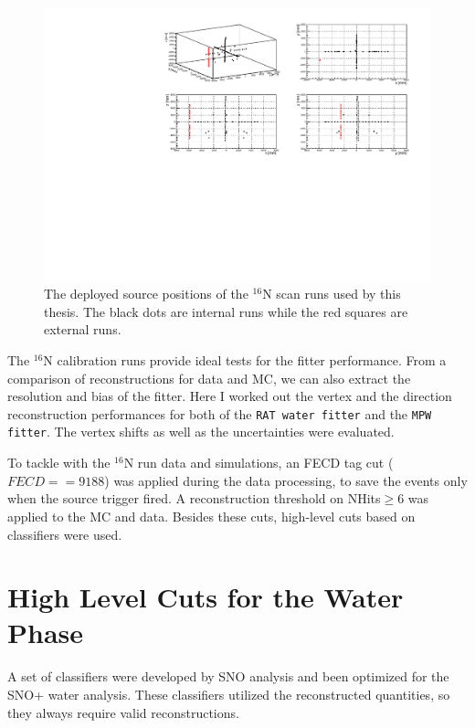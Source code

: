\begin{figure}[!htb]
	\centering
	\includegraphics[width=15cm]{N16_3Dscan.pdf}
	\caption[The deployed source positions of the $^{16}$N scan runs.]{The deployed source positions of the $^{16}$N scan runs used by this thesis. The black dots are internal runs while the red squares are external runs.}
	\label{N16_3Dscan}
\end{figure}

The $^{16}$N calibration runs provide ideal tests for the fitter performance. From a comparison of reconstructions for data and MC, we can also extract the resolution and bias of the fitter. Here I worked out the vertex and the direction reconstruction performances for both of the \texttt{RAT water fitter} and the \texttt{MPW fitter}. The vertex shifts as well as the uncertainties were evaluated. 

To tackle with the $^{16}$N run data and simulations, an FECD tag cut ($FECD==9188$) was applied during the data processing, to save the events only when the source trigger fired. A reconstruction threshold on NHits$\geq 6$ was applied to the MC and data. Besides these cuts, high-level cuts based on classifiers were used. 

\section{High Level Cuts for the Water Phase}\label{sect:high_level_cuts}
A set of classifiers were developed by SNO analysis and been optimized for the SNO+ water analysis\cite{highlevel}. These classifiers utilized the reconstructed quantities, so they always require valid reconstructions.

